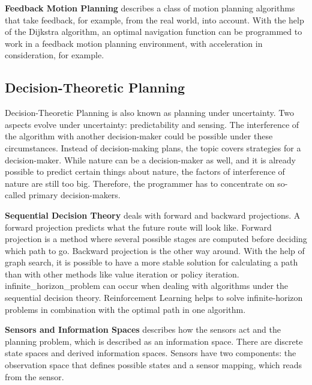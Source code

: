 \textbf{Feedback Motion Planning} describes a class of motion planning algorithms that take feedback, for example, from the real world, into account. With the help of the Dijkstra algorithm, \cite{dijkstras_algorithm} an optimal navigation function can be programmed to work in a feedback motion planning environment, with acceleration in consideration, for example. \cite{planning_algorithms_steven_m_lavalle}

\subsection{Decision-Theoretic Planning} \label{sec:Decision-Theoretic Planning}
Decision-Theoretic Planning is also known as planning under uncertainty. Two aspects evolve under uncertainty: predictability and sensing. The interference of the algorithm with another decision-maker could be possible under these circumstances. Instead of decision-making plans, the topic covers strategies for a decision-maker. While nature can be a decision-maker as well, and it is already possible to predict certain things about nature, the factors of interference of nature are still too big. Therefore, the programmer has to concentrate on so-called primary decision-makers. \cite{planning_algorithms_steven_m_lavalle}

\textbf{Sequential Decision Theory} deals with forward and backward projections. A forward projection predicts what the future route will look like. Forward projection is a method where several possible stages are computed before deciding which path to go. Backward projection is the other way around. With the help of graph search, it is possible to have a more stable solution for calculating a path than with other methods like value iteration or policy iteration. \Gls{infinite_horizon_problem} can occur when dealing with algorithms under the sequential decision theory. Reinforcement Learning helps to solve infinite-horizon problems in combination with the optimal path in one algorithm. \cite{planning_algorithms_steven_m_lavalle}

\textbf{Sensors and Information Spaces} describes how the sensors act and the planning problem, which is described as an information space. There are discrete state spaces and derived information spaces. Sensors have two components: the observation space that defines possible states and a sensor mapping, which reads from the sensor. \cite{planning_algorithms_steven_m_lavalle}

